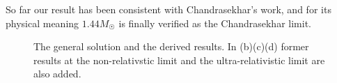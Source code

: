 \documentclass[a4paper,11pt]{article}
\numberwithin{equation}{section}
\numberwithin{table}{section}
\numberwithin{figure}{section}
\begin{document}
			So far our result has been consistent with Chandrasekhar's work, and for its physical meaning $1.44M_{\astrosun}$ is finally verified as the Chandrasekhar limit. 
			\begin{figure}[htbp]
				\flushright
				\caption{The general solution and the derived results. In (b)(c)(d) former results at the non-relativstic limit and the ultra-relativistic limit are also added. }
				\label{fig:solution_general}
			\end{figure}
	
\end{document}
